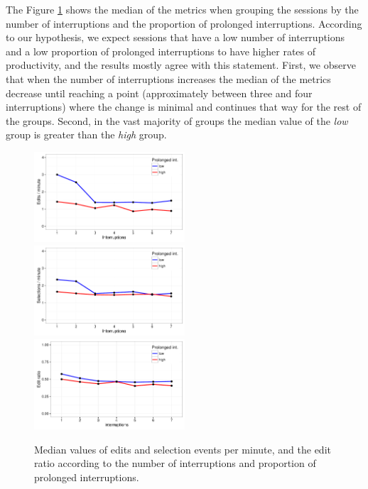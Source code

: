 The Figure \ref{fig:udc_rq2} shows the median of the metrics when grouping the sessions by the number of interruptions and the proportion of prolonged interruptions. According to our hypothesis, we expect sessions that have a low number of interruptions and a low proportion of prolonged interruptions to have higher rates of productivity, and the results mostly agree with this statement. First, we observe that when the number of interruptions increases the median of the metrics decrease until reaching a point (approximately between three and four interruptions) where the change is minimal and continues that way for the rest of the groups. Second, in the vast majority of groups the median value of the \emph{low} group is greater than the \emph{high} group.

\begin{figure}[!ht]
	\centering		
	\includegraphics[width=0.5\textwidth]{Figures/UDC_rq2_emin}
	\includegraphics[width=0.5\textwidth]{Figures/UDC_rq2_smin}
	\includegraphics[width=0.5\textwidth]{Figures/UDC_rq2_eratio}

	\caption{Median values of edits and selection events per minute, and the edit ratio according to the number
		of interruptions and proportion of prolonged interruptions.}
		\label{fig:udc_rq2}
\end{figure}

